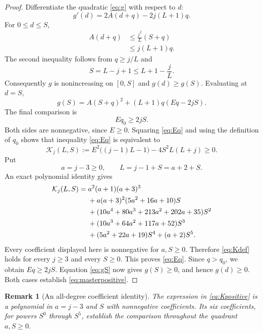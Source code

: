 \documentclass[11pt,a4paper]{article}
\newtheorem{remark}[theorem]{Remark}
\begin{document}
\begin{proof}
Differentiate the quadratic \eqref{eq:g} with respect to $d$:
\[
 g'(d)=2A(d+q)-2j(L+1)q.
\]
For $0\le d\le S$,
\begin{align*}
 A(d+q)&\le \frac{j^2}{L}(S+q)\\
 &\le j(L+1)q.
\end{align*}
The second inequality follows from $q\ge j/L$ and
\[
 S=L-j+1\le L+1-\frac jL.
\]
Consequently $g$ is nonincreasing on $[0,S]$ and $g(d)\ge g(S)$. Evaluating at $d=S$,
\begin{equation}\label{eq:gS}
 g(S)=A(S+q)^2+(L+1)q(Eq-2jS).
\end{equation}
The final comparison is
\begin{equation}\label{eq:Eq}
 Eq_0\ge2jS.
\end{equation}
Both sides are nonnegative, since $E\ge0$. Squaring \eqref{eq:Eq} and using the definition of $q_0$ shows that inequality \eqref{eq:Eq} is equivalent to
\begin{equation}\label{eq:Kdef}
 \mathcal K_j(L,S):=
 E^2\bigl((j-1)L-1\bigr)-4S^2L(L+j)\ge0.
\end{equation}
Put
\[
 a=j-3\ge0,\qquad L=j-1+S=a+2+S.
\]
An exact polynomial identity gives
\begin{align}\label{eq:Kpositive}
 \mathcal K_j(L,S)={}&a^2(a+1)(a+3)^3\\
 &+a(a+3)^2(5a^2+16a+10)S\notag\\
 &+(10a^4+80a^3+213a^2+202a+35)S^2\notag\\
 &+(10a^3+64a^2+117a+52)S^3\notag\\
 &+(5a^2+22a+19)S^4+(a+2)S^5.\notag
\end{align}
Every coefficient displayed here is nonnegative for $a,S\ge0$. Therefore \eqref{eq:Kdef} holds for every $j\ge3$ and every $S\ge0$. This proves \eqref{eq:Eq}. Since $q>q_0$, we obtain $Eq\ge2jS$. Equation \eqref{eq:gS} now gives $g(S)\ge0$, and hence $g(d)\ge0$. Both cases establish \eqref{eq:masterpositive}.
\end{proof}

\begin{remark}[An all-degree coefficient identity]
The expression in \eqref{eq:Kpositive} is a polynomial in $a=j-3$ and $S$ with nonnegative coefficients. Its six coefficients, for powers $S^0$ through $S^5$, establish the comparison throughout the quadrant $a,S\ge0$.
\end{remark}
\end{document}
